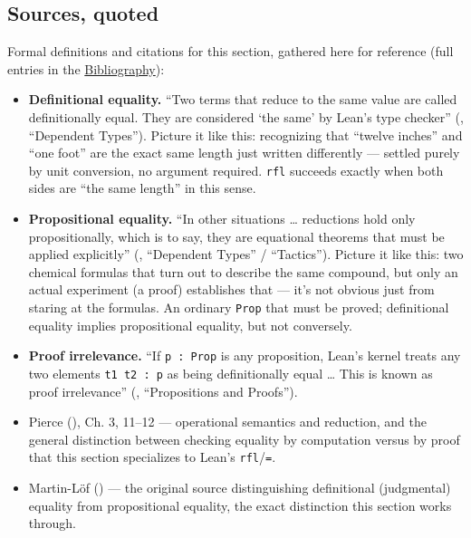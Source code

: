 \subsection{Sources, quoted}\label{sec:05-rigor-check:04-defeq-vs-propeq:7}

Formal definitions and citations for this section, gathered here for reference (full entries in the \hyperref[sec:root:bibliography:1]{Bibliography}):

\begin{itemize}
\tightlist
\item
  \textbf{Definitional equality.} ``Two terms that reduce to the same value are called definitionally equal. They are considered `the same' by Lean's type checker'' (\cite{TPIL4}, ``Dependent Types''). Picture it like this: recognizing that ``twelve inches'' and ``one foot'' are the exact same length just written differently --- settled purely by unit conversion, no argument required. \texttt{rfl} succeeds exactly when both sides are ``the same length'' in this sense.
\item
  \textbf{Propositional equality.} ``In other situations \ldots{} reductions hold only propositionally, which is to say, they are equational theorems that must be applied explicitly'' (\cite{TPIL4}, ``Dependent Types'' / ``Tactics''). Picture it like this: two chemical formulas that turn out to describe the same compound, but only an actual experiment (a proof) establishes that --- it's not obvious just from staring at the formulas. An ordinary \texttt{Prop} that must be proved; definitional equality implies propositional equality, but not conversely.
\item
  \textbf{Proof irrelevance.} ``If \texttt{p : Prop} is any proposition, Lean's kernel treats any two elements \texttt{t1 t2 : p} as being definitionally equal \ldots{} This is known as proof irrelevance'' (\cite{TPIL4}, ``Propositions and Proofs'').
\item
  Pierce (\cite{Pierce2002}), Ch. 3, 11--12 --- operational semantics and reduction, and the general distinction between checking equality by computation versus by proof that this section specializes to Lean's \texttt{rfl}/\texttt{=}.
\item
  Martin-Löf (\cite{MartinLof1984}) --- the original source distinguishing definitional (judgmental) equality from propositional equality, the exact distinction this section works through.
\end{itemize}
